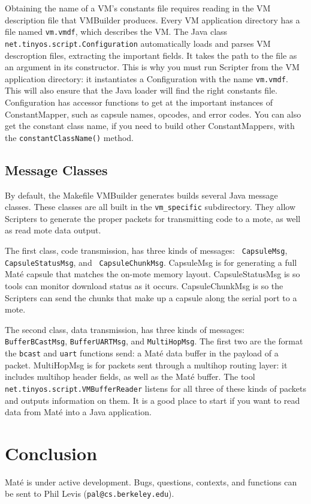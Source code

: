 \documentclass[12pt]{article}
\newcommand{\mate}{Mat\'{e}\xspace}
\begin{document}
Obtaining the name of a VM's constants file requires reading in the VM
description file that VMBuilder produces. Every VM application
directory has a file named {\tt vm.vmdf}, which describes the VM. The
Java class {\tt net.tinyos.script.Configuration} automatically loads
and parses VM descroption files, extracting the important fields. It
takes the path to the file as an argument in its constructor. This is
why you must run Scripter from the VM application directory: it
instantiates a Configuration with the name {\tt vm.vmdf}. This will
also ensure that the Java loader will find the right constants
file. Configuration has accessor functions to get at the important
instances of ConstantMapper, such as capsule names, opcodes, and error
codes. You can also get the constant class name, if you need to build
other ConstantMappers, with the {\tt constantClassName()} method.


\subsection{Message Classes}

By default, the Makefile VMBuilder generates builds several Java
message classes. These classes are all built in the {\tt vm\_specific}
subdirectory. They allow Scripters to generate the proper packets for
transmitting code to a mote, as well as read mote data output.

The first class, code transmission, has three kinds of messages: {\tt
CapsuleMsg}, {\tt CapsuleStatusMsg}, and {\tt
CapsuleChunkMsg}. CapsuleMsg is for generating a full \mate capsule
that matches the on-mote memory layout. CapsuleStatusMsg is so tools
can monitor download status as it occurs. CapsuleChunkMsg is so the
Scripters can send the chunks that make up a capsule along the serial
port to a mote.

The second class, data transmission, has three kinds of messages: {\tt
BufferBCastMsg}, {\tt BufferUARTMsg}, and {\tt MultiHopMsg}. The first
two are the format the {\tt bcast} and {\tt uart} functions send: a
\mate data buffer in the payload of a packet. MultiHopMsg is for
packets sent through a multihop routing layer: it includes multihop
header fields, as well as the \mate buffer. The tool {\tt
net.tinyos.script.VMBufferReader} listens for all three of these kinds
of packets and outputs information on them. It is a good place to
start if you want to read data from \mate into a Java application.


\section{Conclusion}

\mate is under active development. Bugs, questions, contexts, and
functions can be sent to Phil Levis ({\tt pal@cs.berkeley.edu}).
\end{document}
